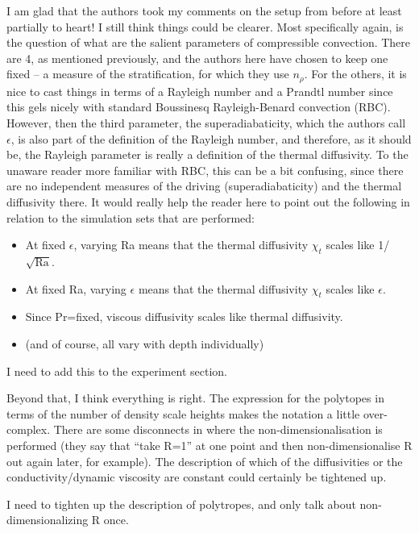 \documentclass[aps, 11pt, singlecolumn]{revtex4-1} %
\begin{document}
\begin{singlespace}
\begin{myquotation}
I am glad that the authors took my comments on the setup from before
at least partially to heart! I still think things could be clearer.
Most specifically again, is the question of what are the salient
parameters of compressible convection. There are 4, as mentioned
previously, and the authors here have chosen to keep one fixed -- a
measure of the stratification, for which they use $n_\rho$. For the
others, it is nice to cast things in terms of a Rayleigh number and a
Prandtl number since this gels nicely with standard Boussinesq
Rayleigh-Benard convection (RBC). However, then the third parameter,
the superadiabaticity, which the authors call $\epsilon$, is also part of
the definition of the Rayleigh number, and therefore, as it should be,
the Rayleigh parameter is really a definition of the thermal
diffusivity. To the unaware reader more familiar with RBC, this can be
a bit confusing, since there are no independent measures of the
driving (superadiabaticity) and the thermal diffusivity there. It
would really help the reader here to point out the following in
relation to the simulation sets that are performed:

\begin{itemize}
\item At fixed $\epsilon$, varying Ra means that the thermal diffusivity $\chi_t$
scales like 1/$\sqrt{\text{Ra}}$.
\item At fixed Ra, varying $\epsilon$ means that the thermal diffusivity $\chi_t$
scales like $\epsilon$.
\item Since Pr=fixed, viscous diffusivity scales like thermal diffusivity.
\item (and of course, all vary with depth individually)
\end{itemize}
\end{myquotation}
I need to add this to the experiment section.

\begin{myquotation}
Beyond that, I think everything is right. The expression for the
polytopes in terms of the number of density scale heights makes the
notation a little over-complex. There are some disconnects in where
the non-dimensionalisation is performed (they say that ``take R=1'' at
one point and then non-dimensionalise R out again later, for example).
The description of which of the diffusivities or the
conductivity/dynamic viscosity are constant could certainly be
tightened up.
\end{myquotation}
I need to tighten up the description of polytropes, and only talk about
non-dimensionalizing R once.


\end{singlespace}
\end{document}
